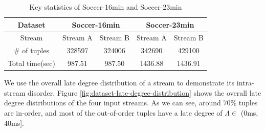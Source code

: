 \documentclass[a4paper, 11pt, twoside]{report}
\begin{document}
\begin{table}[h]
\begin{center}
\begin{tabular}{|c|c|c|c|c|}
\hline
Dataset    & \multicolumn{2}{c|}{Soccer-16min} & \multicolumn{2}{c|}{Soccer-23min} \\ \hline
Stream     & Stream A        & Stream B        & Stream A        & Stream B        \\ \hline
\# of tuples  & 328597          & 324006          & 342690          & 429100          \\ \hline
Total time(sec) & 987.51       & 987.50       & 1436.88      & 1436.91      \\ \hline
\end{tabular}
\caption{Key statistics of Soccer-16min and Soccer-23min\label{table:dataset-statistics}}
\end{center}
\end{table}

We use the overall late degree distribution of a stream to demonstrate its intra-stream disorder. Figure \ref{fig:dataset-late-degree-distribution} shows the overall late degree distributions of the four input streams. As we can see, around 70\% tuples are in-order, and most of the out-of-order tuples have a late degree of $\Lambda \in$ (0ms, 40ms].\\
\end{document}
